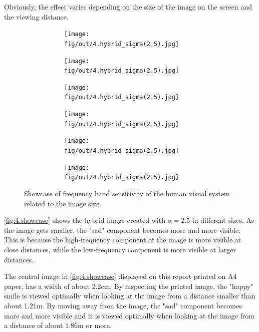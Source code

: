 \documentclass[tikz,14pt,fleqn]{article}
\begin{document}
Obviously, the effect varies depending on the size of the image on the screen and the viewing distance.


\begin{figure}[H]
    \centering
    \begin{subfigure}[]{.8\linewidth}
        \begin{subfigure}[]{.25\linewidth}
            \texttt{[image: fig/out/4.hybrid\_sigma(2.5).jpg]}
        \end{subfigure}
        \begin{subfigure}[]{.2\linewidth}
            \texttt{[image: fig/out/4.hybrid\_sigma(2.5).jpg]}
        \end{subfigure}
        \begin{subfigure}[]{.16\linewidth}
            \texttt{[image: fig/out/4.hybrid\_sigma(2.5).jpg]}
        \end{subfigure}
        \begin{subfigure}[]{.128\linewidth}
            \texttt{[image: fig/out/4.hybrid\_sigma(2.5).jpg]}
        \end{subfigure}
        \begin{subfigure}[]{.1024\linewidth}
            \texttt{[image: fig/out/4.hybrid\_sigma(2.5).jpg]}
        \end{subfigure}
        \begin{subfigure}[]{.08192\linewidth}
            \texttt{[image: fig/out/4.hybrid\_sigma(2.5).jpg]}
        \end{subfigure}
    \end{subfigure}
    \caption{Showcase of frequency band sensitivity of the human visual system related to the image size.}
    \label{fig:4.showcase}
\end{figure}

\autoref{fig:4.showcase} shows the hybrid image created with $\sigma=2.5$ in different sizes. As the image gets smaller, the "sad" component becomes more and more visible. This is because the high-frequency component of the image is more visible at close distances, while the low-frequency component is more visible at larger distances.

The central image in \autoref{fig:4.showcase} displayed on this report printed on A4 paper, has a width of about 2.2cm. By inspecting the printed image, the "happy" smile is viewed optimally when looking at the image from a distance smaller than about 1.21m. By moving away from the image, the "sad" component becomes more and more visible and it is viewed optimally when looking at the image from a distance of about 1.86m or more.
\end{document}
